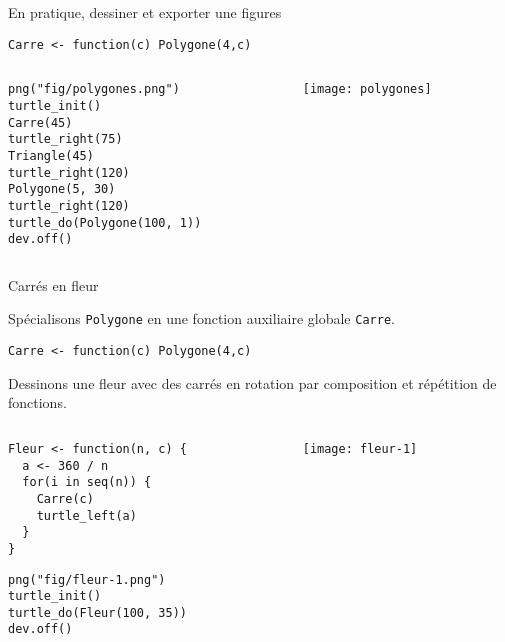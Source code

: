 \documentclass[10pt]{beamer}
\begin{document}
\begin{frame}[fragile]{En pratique, dessiner et exporter une figures}

  \begin{lstlisting}[style=editor]
Carre <- function(c) Polygone(4,c)
\end{lstlisting}

\begin{columns}[c]
\begin{column}{0.48\textwidth}
  \begin{lstlisting}
png("fig/polygones.png")
turtle_init()
Carre(45)
turtle_right(75)
Triangle(45)
turtle_right(120)
Polygone(5, 30)
turtle_right(120)
turtle_do(Polygone(100, 1))
dev.off()
\end{lstlisting}
\end{column}

\begin{column}{0.48\textwidth}
    \texttt{[image: polygones]}
\end{column}
\end{columns}
\end{frame}

\begin{frame}[fragile]{Carrés en fleur}

  Spécialisons \texttt{Polygone} en une \alert{fonction auxiliaire globale} \texttt{Carre}.
  \begin{lstlisting}[style=editor]
Carre <- function(c) Polygone(4,c)
\end{lstlisting}

Dessinons une fleur avec des carrés en rotation par \alert{composition et répétition de fonctions}.

\begin{columns}[c]
\begin{column}{0.58\textwidth}
  \begin{lstlisting}[style=editor]
Fleur <- function(n, c) {
  a <- 360 / n
  for(i in seq(n)) {
    Carre(c)
    turtle_left(a)
  }
}
\end{lstlisting}

\begin{lstlisting}[linerange=2-3]
png("fig/fleur-1.png")
turtle_init()
turtle_do(Fleur(100, 35))
dev.off()
\end{lstlisting}
\end{column}

\begin{column}{0.38\textwidth}
    \texttt{[image: fleur-1]}
\end{column}
\end{columns}
\end{frame}
\end{document}
